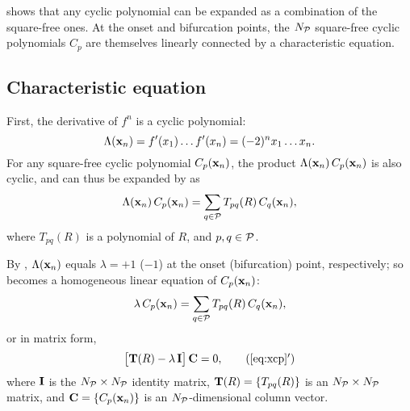 \documentclass{ws-ijbc}
\begin{document}
  shows that any cyclic polynomial can be expanded
  as a combination of the square-free ones.
At the onset and bifurcation points,
  the $N_\mathcal P$ square-free cyclic polynomials $C_p$ are themselves
  linearly connected by a characteristic equation.


\subsection{\label{sec:algo}Characteristic equation}




First, the derivative of $f^n$ is a cyclic polynomial:
%
%
\begin{equation}
  \Lambda(\mathbf{x}_{n})
   = f'(x_1) \dots f'(x_n)
   = (-2)^n x_1 \dots x_n.
\label{eq:logder}
\end{equation}
%
%
For any square-free cyclic polynomial $C_p(\mathbf{x}_{n})$,
the product $\Lambda(\mathbf{x}_{n}) \, C_p(\mathbf{x}_{n})$ is also cyclic,
  and can thus be expanded by  as
\begin{equation}
  \Lambda(\mathbf{x}_{n}) \, C_p(\mathbf{x}_{n}) = \sum_{q \in \mathcal P} T_{pq}(R) \, C_q(\mathbf{x}_{n}),
\label{eq:xcp0}
\end{equation}
where $T_{pq}(R)$ is a polynomial of $R$,
and $p, q \in \mathcal P$.



By ,
  $\Lambda(\mathbf{x}_{n})$ equals $\lambda = +1$ ($-1$)
  at the onset (bifurcation) point,
  respectively;
  so 
  becomes a homogeneous linear equation of
  $C_p(\mathbf{x}_{n})$:
\begin{equation}
  \lambda \, C_p(\mathbf{x}_{n}) = \sum_{q \in \mathcal P} T_{pq}(R) \, C_q(\mathbf{x}_{n}),
\label{eq:xcp}
\end{equation}
%
%
or in matrix form,
\begin{equation}
  \big[ \vct T(R) - \lambda \, \vct I \big] \, \vct C = 0,
\tag{\ref{eq:xcp}$'$}
\end{equation}
%
%
where
$\mathbf{I}$ is the $N_\mathcal P \times N_\mathcal P$ identity matrix,
$\mathbf{T}(R) = \{T_{pq}(R)\}$ is an $N_\mathcal P \times N_\mathcal P$ matrix,
and
$\mathbf{C} = \{C_p(\mathbf{x}_{n})\}$ is an $N_\mathcal P$-dimensional column vector.
\end{document}
